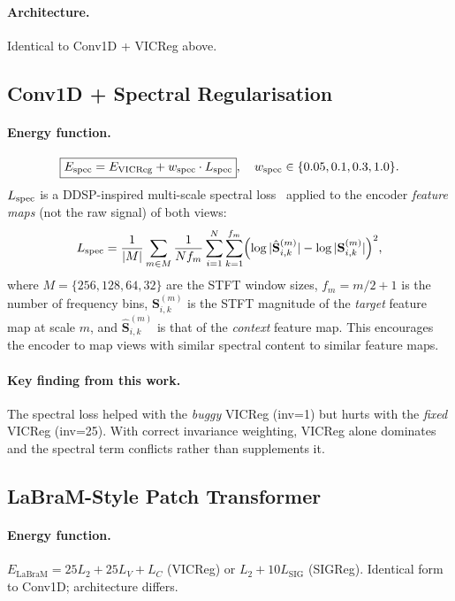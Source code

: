 \documentclass[11pt,a4paper]{article}
\begin{document}
\paragraph{Architecture.} Identical to Conv1D + VICReg above.

\subsection{Conv1D + Spectral Regularisation}
\label{sec:math_spectral}

\paragraph{Energy function.}
\begin{equation}
  \boxed{E_{\mathrm{spec}} = E_{\mathrm{VICReg}} + w_{\rm spec} \cdot L_{\rm spec}},
  \quad w_{\rm spec} \in \{0.05, 0.1, 0.3, 1.0\}.
\end{equation}
$L_{\rm spec}$ is a DDSP-inspired multi-scale spectral loss~\cite{engel2020ddsp} applied
to the encoder \emph{feature maps} (not the raw signal) of both views:
\begin{equation}
  L_{\rm spec} = \frac{1}{|M|}\sum_{m \in M} \frac{1}{N f_m}\sum_{i=1}^N\sum_{k=1}^{f_m}
    \Bigl(\log|\hat{\mathbf{S}}^{(m)}_{i,k}| - \log|\mathbf{S}^{(m)}_{i,k}|\Bigr)^2,
\end{equation}
where $M = \{256, 128, 64, 32\}$ are the STFT window sizes, $f_m = m/2 + 1$ is the
number of frequency bins, $\mathbf{S}^{(m)}_{i,k}$ is the STFT magnitude of the
\emph{target} feature map at scale $m$, and $\hat{\mathbf{S}}^{(m)}_{i,k}$ is that of
the \emph{context} feature map.  This encourages the encoder to map views with similar
spectral content to similar feature maps.

\paragraph{Key finding from this work.}
The spectral loss helped with the \emph{buggy} VICReg (inv=1) but hurts with the
\emph{fixed} VICReg (inv=25).  With correct invariance weighting, VICReg alone dominates
and the spectral term conflicts rather than supplements it.

\subsection{LaBraM-Style Patch Transformer}
\label{sec:math_labram}

\paragraph{Energy function.}
$E_{\mathrm{LaBraM}} = 25 L_2 + 25 L_V + L_C$ (VICReg) or $L_2 + 10 L_{\mathrm{SIG}}$
(SIGReg).  Identical form to Conv1D; architecture differs.
\end{document}
